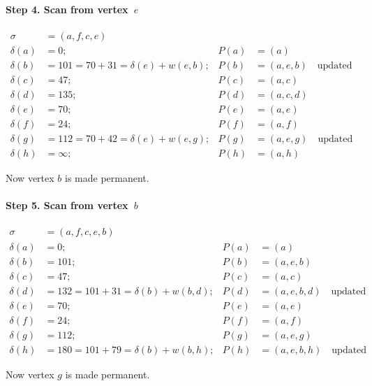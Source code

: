 \documentclass[10pt,]{book}
\theoremstyle{plain}
\theoremstyle{definition}
\theoremstyle{definition}
\theoremstyle{definition}
\theoremstyle{definition}
\numberwithin{equation}{section}
\newcommand{\amp}{&}
\begin{document}
\paragraph[{Step 4.  Scan from vertex~\(e\)}]{Step 4.  Scan from vertex~\(e\)}\hypertarget{paragraphs-4}{}
\hypertarget{p-214}{}%
%
\begin{align*}
\sigma\amp=(a,f,c,e)\\
\delta(a)\amp=0; \amp P(a)\amp=(a)\\
\delta(b)\amp=101=70+31= \delta(e)+w(e,b); \amp P(b)\amp=(a,e,b)\quad\text{updated}\\
\delta(c)\amp=47; \amp P(c)\amp=(a,c)\\
\delta(d)\amp=135; \amp P(d)\amp=(a,c,d)\\
\delta(e)\amp=70; \amp P(e)\amp=(a,e)\\
\delta(f)\amp=24; \amp P(f)\amp=(a,f)\\
\delta(g)\amp=112=70+42= \delta(e)+w(e,g); \amp P(g)\amp=(a,e,g)\quad\text{updated}\\
\delta(h)\amp=\infty; \amp P(h)\amp=(a,h)
\end{align*}
%
\par
\hypertarget{p-215}{}%
Now vertex \(b\) is made permanent.%
\typeout{************************************************}
\typeout{************************************************}
\paragraph[{Step 5.  Scan from vertex~\(b\)}]{Step 5.  Scan from vertex~\(b\)}\hypertarget{paragraphs-5}{}
\hypertarget{p-216}{}%
%
\begin{align*}
\sigma\amp=(a,f,c,e,b)\\
\delta(a)\amp=0; \amp P(a)\amp=(a)\\
\delta(b)\amp=101; \amp P(b)\amp=(a,e,b)\\
\delta(c)\amp=47; \amp P(c)\amp=(a,c)\\
\delta(d)\amp= 132 = 101+ 31= \delta(b)+w(b,d); \amp P(d)\amp=(a,e,b,d)\quad\text{updated} \\
\delta(e)\amp= 70; \amp P(e)\amp=(a,e)\\
\delta(f)\amp= 24; \amp P(f)\amp=(a,f)\\
\delta(g)\amp=112; \amp P(g)\amp=(a,e,g)\\
\delta(h)\amp=180 = 101+79=\delta(b)+w(b,h); \amp P(h)\amp=(a,e,b,h)\quad\text{updated} 
\end{align*}
%
\par
\hypertarget{p-217}{}%
Now vertex \(g\) is made permanent.%
\typeout{************************************************}
\typeout{************************************************}
\end{document}
